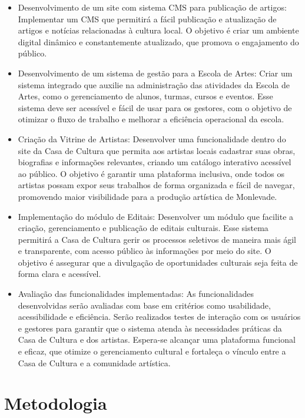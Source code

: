 \begin{itemize}
	\item Desenvolvimento de um site com sistema \ac{CMS} para publicação de artigos: Implementar um \ac{CMS} que permitirá a fácil publicação e atualização de artigos e notícias relacionadas à cultura local. O objetivo é criar um ambiente digital dinâmico e constantemente atualizado, que promova o engajamento do público.

	\item Desenvolvimento de um sistema de gestão para a Escola de Artes: Criar um sistema integrado que auxilie na administração das atividades da Escola de Artes, como o gerenciamento de alunos, turmas, cursos e eventos. Esse sistema deve ser acessível e fácil de usar para os gestores, com o objetivo de otimizar o fluxo de trabalho e melhorar a eficiência operacional da escola.

	\item Criação da Vitrine de Artistas: Desenvolver uma funcionalidade dentro do site da Casa de Cultura que permita aos artistas locais cadastrar suas obras, biografias e informações relevantes, criando um catálogo interativo acessível ao público. O objetivo é garantir uma plataforma inclusiva, onde todos os artistas possam expor seus trabalhos de forma organizada e fácil de navegar, promovendo maior visibilidade para a produção artística de Monlevade.

	\item Implementação do módulo de Editais: Desenvolver um módulo que facilite a criação, gerenciamento e publicação de editais culturais. Esse sistema permitirá a Casa de Cultura gerir os processos seletivos de maneira mais ágil e transparente, com acesso público às informações por meio do site. O objetivo é assegurar que a divulgação de oportunidades culturais seja feita de forma clara e acessível.

	\item Avaliação das funcionalidades implementadas: As funcionalidades desenvolvidas serão avaliadas com base em critérios como usabilidade, acessibilidade e eficiência. Serão realizados testes de interação com os usuários e gestores para garantir que o sistema atenda às necessidades práticas da Casa de Cultura e dos artistas. Espera-se alcançar uma plataforma funcional e eficaz, que otimize o gerenciamento cultural e fortaleça o vínculo entre a Casa de Cultura e a comunidade artística.
\end{itemize}


\section{Metodologia}
\label{sec:metodologia}

